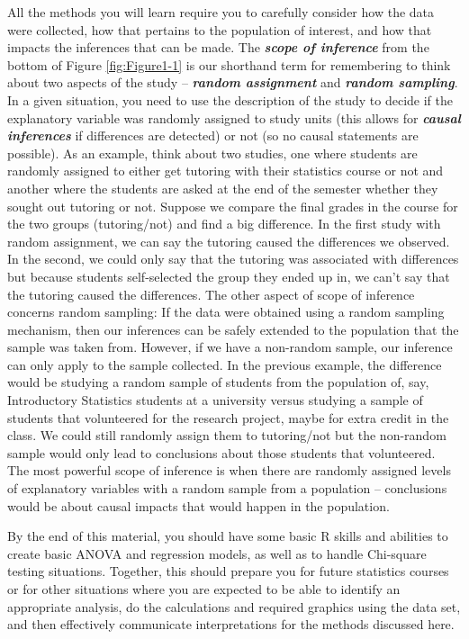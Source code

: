 \documentclass[
]{book}
\begin{document}
\indent All the methods you will learn require you to carefully consider how the data were collected, how that
pertains to the population of interest, and how that impacts the inferences
that can be made. The \textbf{\emph{scope of inference}} from the bottom of Figure
\ref{fig:Figure1-1} is our shorthand term for remembering to think about two aspects
of the study -- \textbf{\emph{random assignment}} and \textbf{\emph{random sampling}}.
  In a given
situation, you need to use the description of the study to decide if the
explanatory variable was randomly assigned to study units (this allows for \textbf{\emph{causal inferences}}  if differences are detected) or not (so no causal statements
are possible). As an example, think about two studies, one where students are
randomly assigned to either get tutoring with their statistics course or not
and another where the students are asked at the end of the semester whether
they sought out tutoring or not. Suppose we compare the final grades in the
course for the two groups (tutoring/not) and find a big difference. In the
first study with random assignment,  we can say the tutoring caused the
differences we observed. In the second, we could only say that the tutoring was
associated with differences but because students self-selected the group they
ended up in, we can't say that the tutoring caused the differences. The other
aspect of scope of inference concerns random sampling:  If the data were obtained
using a random sampling mechanism, then our inferences can be safely extended
to the population that the sample was taken from. However, if we have a non-random
sample, our inference can only apply to the sample collected. In the previous
example, the difference would be studying a random sample of students from the
population of, say, Introductory Statistics students at a university versus
studying a sample of students that volunteered for the research project, maybe
for extra credit in the class. We could still randomly assign them to
tutoring/not but the non-random sample would only lead to conclusions about
those students that volunteered. The most powerful scope of inference is when there
are randomly assigned levels of explanatory variables with a random sample from
a population -- conclusions would be about causal impacts that would happen in the
population.

\indent By the end of this material, you should have some basic R skills and abilities to create basic ANOVA and
regression models, as well as to handle Chi-square testing situations.
Together, this should prepare you for future statistics courses or for other
situations where you are expected to be able to identify an appropriate
analysis, do the calculations and required graphics using the data set, and then effectively
communicate interpretations for the methods discussed here.
\end{document}
